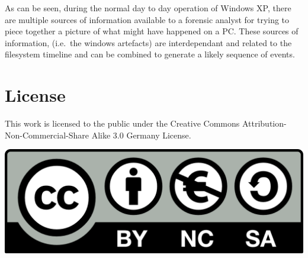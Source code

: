 \documentclass[a4paper,
    11pt,
    normalheadings,
    parindent,
    UKenglish,
    abstracton,
    ]{scrartcl}
\begin{document}
As can be seen, during the normal day to day operation of Windows XP, there are multiple sources of information available to a forensic analyst for trying to piece together a picture of what might have happened on a PC.
These sources of information, (i.e.\, the windows artefacts) are interdependant and related to the filesystem timeline and can be combined to generate a likely sequence of events.

\section*{License}
This work is licensed to the public under the Creative Commons Attribution-Non-Commercial-Share Alike 3.0 Germany License.
\begin{center}\includegraphics{bin/by-nc-sa-eu.png}\end{center}
\end{document}
